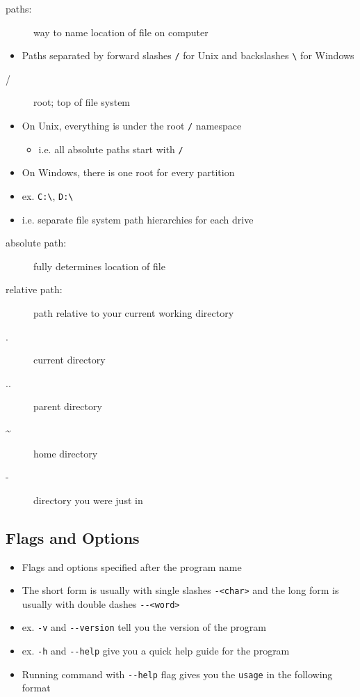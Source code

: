 \documentclass[letterpaper,12pt]{article}
\begin{document}
\begin{description}
 \item[paths:] way to name location of file on computer
\end{description}

\begin{itemize}
 \item Paths separated by forward slashes \lstinline{/} for Unix and backslashes \lstinline{\} for Windows
\end{itemize}

\begin{description}
 \item[/] root; top of file system
\end{description}

\begin{itemize}
 \item On Unix, everything is under the root \lstinline{/} namespace
       \begin{itemize}
        \item i.e. all absolute paths start with \lstinline{/}
       \end{itemize}
 \item On Windows, there is one root for every partition
 \item ex. \lstinline{C:\}, \lstinline{D:\}
 \item i.e. separate file system path hierarchies for each drive
\end{itemize}

\begin{description}
 \item[absolute path:] fully determines location of file
 \item[relative path:] path relative to your current working directory
 \item[.] current directory
 \item[..] parent directory
 \item[\textasciitilde] home directory
 \item[-] directory you were just in
\end{description}

\subsection{Flags and Options}

\begin{itemize}
 \item Flags and options specified after the program name
 \item The short form is usually with single slashes \lstinline{-<char>} and the long form is usually with double dashes \lstinline{--<word>}
 \item ex. \lstinline{-v} and \lstinline{--version} tell you the version of the program
 \item ex. \lstinline{-h} and \lstinline{--help} give you a quick help guide for the program
 \item Running command with \lstinline{--help} flag gives you the \lstinline{usage} in the following format
\end{itemize}
\end{document}
